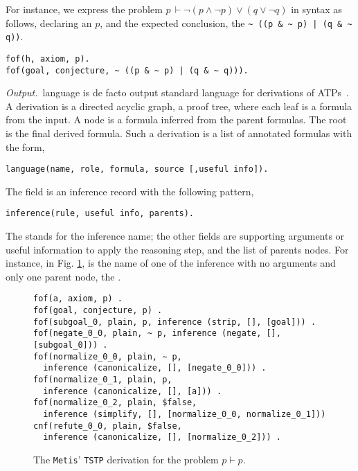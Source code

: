 \documentclass[../main.tex]{subfiles}
\begin{document}
For instance, we express the problem
$p\, \vdash \neg (p \wedge \neg p) \vee (q \vee \neg q)$
in \TPTP syntax as follows, declaring an \tptpaxiom $p$, and the
expected conclusion, the  \tptpconjecture
\verb!~ ((p & ~ p) | (q & ~ q))!.

\begin{verbatim}
fof(h, axiom, p).
fof(goal, conjecture, ~ ((p & ~ p) | (q & ~ q))).
\end{verbatim}

\textit{Output.}~\TSTP language is de facto output standard language
for derivations of ATPs~\cite{sutcliffe2004tstp}. A \TSTP derivation
is a directed acyclic graph, a proof tree, where each leaf is a
formula from the \TPTP input. A node is a formula inferred from the
parent formulas. The root is the final derived formula. Such a
derivation is a list of annotated formulas with the form,

\begin{verbatim}
language(name, role, formula, source [,useful info]).
\end{verbatim}

The  field is an inference record with the following
pattern,

\begin{verbatim}
inference(rule, useful info, parents).
\end{verbatim}

The  stands for the inference name; the other fields are
supporting arguments or useful information to apply the reasoning
step, and the list of parents nodes. For instance, in Fig.
\ref{fig:metis-proof-tstp}, \strip is the name of one of the
inference with no arguments and only one parent node, the
.

\begin{figure}
\begin{verbatim}
fof(a, axiom, p) .
fof(goal, conjecture, p) .
fof(subgoal_0, plain, p, inference (strip, [], [goal])) .
fof(negate_0_0, plain, ~ p, inference (negate, [], [subgoal_0])) .
fof(normalize_0_0, plain, ∼ p,
  inference (canonicalize, [], [negate_0_0])) .
fof(normalize_0_1, plain, p,
  inference (canonicalize, [], [a])) .
fof(normalize_0_2, plain, $false,
  inference (simplify, [], [normalize_0_0, normalize_0_1]))
cnf(refute_0_0, plain, $false,
  inference (canonicalize, [], [normalize_0_2])) .
\end{verbatim}
\caption{The \texttt{Metis}' \texttt{TSTP} derivation for the
problem $p\vdash p$.}
\label{fig:metis-proof-tstp}
\end{figure}
\end{document}
